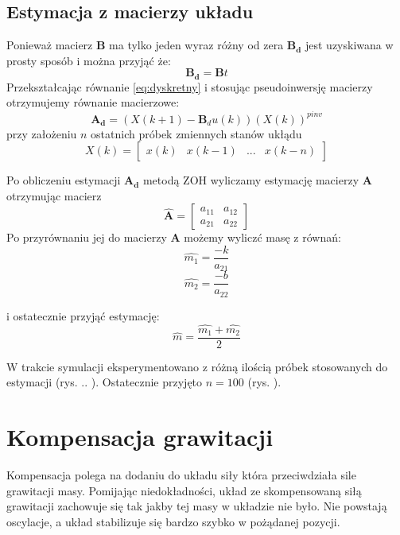 \documentclass[a4paper]{article}
\begin{document}
\subsection{Estymacja z macierzy układu}
\label{pos}
Ponieważ macierz $\mathbf{B}$ ma tylko jeden wyraz różny od zera $\mathbf{B_d}$ jest uzyskiwana w prosty sposób i można przyjąć że:
\begin{equation}
\mathbf{B_d} = \mathbf{B}t
\end{equation} 
Przekształcając równanie \ref{eq:dyskretny} i stosując pseudoinwersję macierzy otrzymujemy równanie macierzowe:
\begin{equation}
	\mathbf{A_d} = (X(k+1) - \mathbf{B}_du(k))(X(k))^{pinv}
	\label{eq:pinv}
\end{equation}
przy założeniu $n$ ostatnich próbek zmiennych stanów ukłądu
\begin{equation}
	X(k) = 	\begin{bmatrix}
		    x(k) & x(k-1)  & ... & x(k-n) 
		\end{bmatrix}
	\label{eq:xk}
\end{equation}

Po obliczeniu estymacji $\mathbf{A_d}$ metodą ZOH wyliczamy estymację macierzy $\mathbf{A}$ otrzymując macierz
\begin{equation}
\mathbf{\hat{A}} = 	\begin{bmatrix}
	    a_{11} & a_{12}\\
	    a_{21} & a_{22}
	\end{bmatrix}
\end{equation} 
Po przyrównaniu jej do macierzy $\mathbf{A}$ możemy wyliczć masę z równań:
\begin{equation}
\hat{m_1} = \frac{-k}{a_{21}}
\end{equation}
\begin{equation}
\hat{m_2} = \frac{-b}{a_{22}}
\end{equation}

i ostatecznie przyjąć estymację:
\begin{equation}
\hat{m} = \frac{\hat{m_1}+\hat{m_2}}{2}
\end{equation}


W trakcie symulacji eksperymentowano z różną ilością próbek stosowanych do estymacji (rys. .. ). Ostatecznie przyjęto $n = 100$ (rys. ).

\section{Kompensacja grawitacji}
Kompensacja polega na dodaniu do układu siły która przeciwdziała sile grawitacji masy. Pomijając niedokładności, układ ze skompensowaną siłą grawitacji zachowuje się tak jakby tej masy w układzie nie było. Nie powstają oscylacje, a układ stabilizuje się bardzo szybko w pożądanej pozycji.
\end{document}
